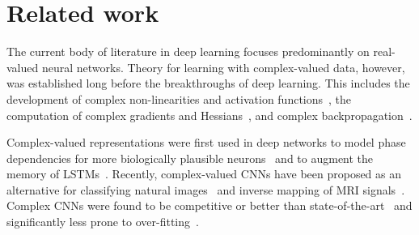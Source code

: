 \documentclass{article}
\begin{document}


\section{Related work}
The current body of literature in deep learning focuses predominantly on real-valued neural networks. Theory for learning with complex-valued data, however, was established long before the breakthroughs of deep learning. %
This includes the development of complex non-linearities and activation  functions~\cite{georgiou1992complex,kim2001complex,uncini1999complex}, the computation of complex gradients and Hessians~\cite{van1994complex,zimmermanncomparison}, and complex backpropagation~\cite{benvenuto1992complex,Brandwood,Franken,goh2004complex,kim2002fully,leung1991complex}. 

Complex-valued representations were first used in deep networks to model phase dependencies for more biologically plausible neurons~\cite{reichert2013neuronal} and to augment the memory of LSTMs~\cite{danihelka2016associative}. Recently, complex-valued CNNs have been proposed as an alternative for classifying natural images~\cite{Guberman,Trabelsi} and inverse mapping of MRI signals~\cite{Virtue}.  Complex CNNs were found to be competitive or better than state-of-the-art~\cite{Trabelsi} and significantly less prone to over-fitting~\cite{Guberman}. %
\end{document}

